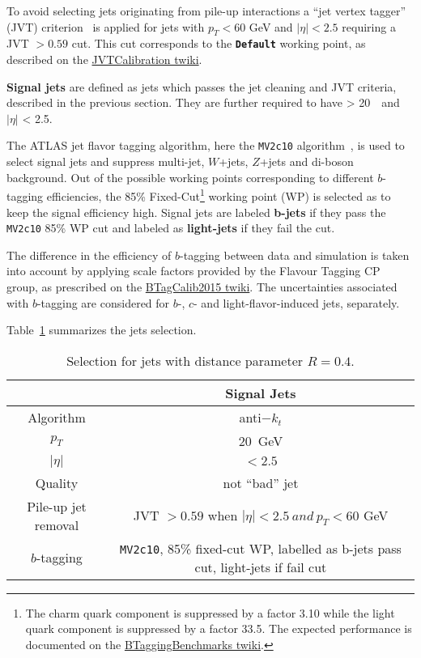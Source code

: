 To avoid selecting jets originating from pile-up interactions a ``jet vertex tagger'' (JVT) criterion~\cite{ATLAS-JVTPaper} is applied for jets with $p_T < 60$ GeV and $|\eta|< 2.5$ requiring a JVT $ > 0.59$ cut. This cut corresponds to the \texttt{\textbf{Default}} working point, as described on the \href{https://twiki.cern.ch/twiki/bin/view/AtlasProtected/JVTCalibration}{JVTCalibration twiki}.

\textbf{Signal jets} are defined as jets which passes the jet cleaning and JVT criteria, described in the previous section.
They are further required to have \pt > 20~\GeV ~and $|\eta|$ < 2.5.

\newcommand{\BTagWPFootNote}{The charm quark component is suppressed by a factor 3.10 while the 
light quark component is suppressed by a factor 33.5. The expected performance is documented 
on the \href{https://twiki.cern.ch/twiki/bin/view/AtlasProtected/BTaggingBenchmarks\#MV2c10_tagger_added_on_11th_May}{BTaggingBenchmarks twiki}.}

The ATLAS jet flavor tagging algorithm, here the \texttt{MV2c10} algorithm~\cite{ATL-PHYS-PUB-2016-012}, is used to select signal jets and suppress multi-jet, $W$+jets, $Z$+jets and di-boson background. 
Out of the possible working points corresponding to different $b$-tagging efficiencies, the 85\% Fixed-Cut\footnote{\BTagWPFootNote} working point (WP) is selected as to keep the signal efficiency high. Signal jets are labeled \textbf{b-jets} if they pass the \texttt{MV2c10} 85\% WP cut and labeled as \textbf{light-jets} if they fail the cut.

The difference in the efficiency of $b$-tagging between data and simulation 
is taken into account by applying scale factors provided by the Flavour Tagging CP group, 
as prescribed on the \href{https://twiki.cern.ch/twiki/bin/view/AtlasProtected/BTagCalib2015}{BTagCalib2015 twiki}. 
The uncertainties associated with $b$-tagging are considered for $b$-, $c$- and light-flavor-induced jets, separately. 

Table~\ref{tab:sjdefinit} summarizes the jets selection. 

\begin{table}[htbp!]
\centering 
\small
\begin{tabular}{|c||c|}        
 \hline
 & Signal Jets\\
 \hline
 Algorithm            & anti$-k_t$\\
 $p_T$                & 20~GeV\\
 $|\eta|$             & $< 2.5 $\\
 Quality              & not ``bad'' jet\\
 Pile-up jet removal & JVT $> 0.59$ when $|\eta| < 2.5 ~ and ~p_T < 60 $ GeV\\    
 $b$-tagging          &  \texttt{MV2c10}, 85\% fixed-cut WP, labelled as b-jets pass cut, light-jets if fail cut\\ 
\hline                          
\end{tabular}
\caption{Selection for jets with distance parameter $R = 0.4$.}
\label{tab:sjdefinit}
\end{table}

